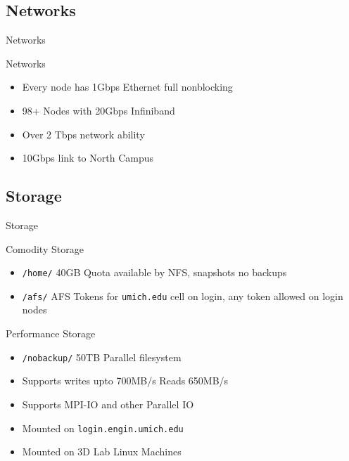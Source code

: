 \documentclass[handout]{beamer}
\begin{document}
   \subsection{Networks}
    \begin{frame}{Networks}
     \begin{block}{Networks}
      \begin{itemize}
       \item Every node has 1Gbps Ethernet full nonblocking
       \item 98+ Nodes with 20Gbps Infiniband
       \item Over 2 Tbps network ability
       \item 10Gbps link to North Campus
      \end{itemize}
     \end{block}
    \end{frame}
   \subsection{Storage}
    \begin{frame}{Storage}
     \begin{block}{Comodity Storage}
      \begin{itemize}
       \item \texttt{/home/} 40GB Quota available by NFS, snapshots no backups
       \item \texttt{/afs/} AFS Tokens for \texttt{umich.edu} cell on login, any token allowed on login nodes
      \end{itemize}
     \end{block}
     \begin{block}{Performance Storage}
      \begin{itemize}
        \item \texttt{/nobackup/} 50TB Parallel filesystem
        \item Supports writes upto 700MB/s Reads 650MB/s
        \item Supports MPI-IO and other Parallel IO
        \item Mounted on \texttt{login.engin.umich.edu}
        \item Mounted on 3D Lab Linux Machines
      \end{itemize}
     \end{block}
    \end{frame}
\end{document}
